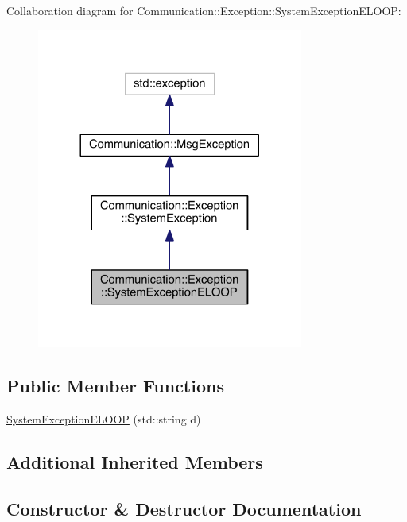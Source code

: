 Collaboration diagram for Communication\+:\+:Exception\+:\+:System\+Exception\+E\+L\+O\+O\+P\+:\nopagebreak
\begin{figure}[H]
\begin{center}
\leavevmode
\includegraphics[width=248pt]{class_communication_1_1_exception_1_1_system_exception_e_l_o_o_p__coll__graph}
\end{center}
\end{figure}
\subsection*{Public Member Functions}
\begin{DoxyCompactItemize}
\item 
\hyperlink{class_communication_1_1_exception_1_1_system_exception_e_l_o_o_p_a12b814eba0a6beaf18208f3e40277f3d}{System\+Exception\+E\+L\+O\+O\+P} (std\+::string d)
\end{DoxyCompactItemize}
\subsection*{Additional Inherited Members}


\subsection{Constructor \& Destructor Documentation}
\hypertarget{class_communication_1_1_exception_1_1_system_exception_e_l_o_o_p_a12b814eba0a6beaf18208f3e40277f3d}{}
